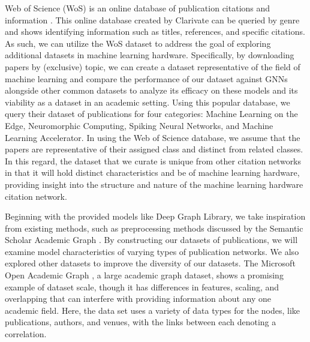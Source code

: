 \documentclass[conference]{IEEEtran}
\begin{document}
Web of Science (WoS) is an online database of publication citations and information \cite{WoS}. 
This online database created by Clarivate can be queried by genre and shows identifying information such as titles, 
references, and specific citations. As such, we can utilize the WoS dataset to address the goal of exploring additional 
datasets in machine learning hardware. Specifically, by downloading papers by (exclusive) topic, 
we can create a dataset representative of the field of machine learning and compare the performance of our dataset 
against GNNs alongside other common datasets to analyze its efficacy on these models and its viability as a dataset 
in an academic setting. Using this popular database, we query their dataset of publications for four categories: 
Machine Learning on the Edge, Neuromorphic Computing, Spiking Neural Networks, and Machine Learning Accelerator. 
In using the Web of Science database, we assume that the papers are representative of their assigned class and 
distinct from related classes. In this regard, the dataset that we curate is unique from other citation networks 
in that it will hold distinct characteristics and be of machine learning hardware, providing insight into the 
structure and nature of the machine learning hardware citation network. \par

Beginning with the provided models like Deep Graph Library, we take inspiration from existing methods, 
such as preprocessing methods discussed by the Semantic Scholar Academic Graph \cite{Wade}. By constructing our 
datasets of publications, we will examine model characteristics of varying types of publication networks. 
We also explored other datasets to improve the diversity of our datasets. The  Microsoft Open Academic Graph \cite{Sinha}, 
a large academic graph dataset, shows a promising example of dataset scale, though it has differences in 
features, scaling, and overlapping that can interfere with providing information about any one academic field. 
Here, the data set uses a variety of data types for the nodes, like publications, authors, and venues, with 
the links between each denoting a correlation. \par 
\end{document}
